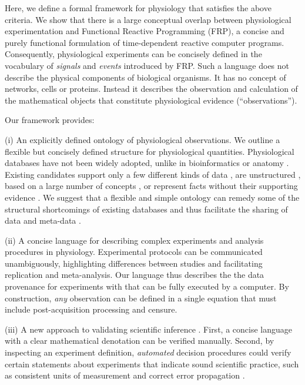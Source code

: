 \documentclass[11pt]{article}
\begin{document}
Here, we define a formal framework for physiology
that satisfies the above criteria. We show that there
is a large conceptual overlap between physiological experimentation
and Functional Reactive Programming (FRP\cite{Elliott1997,
  Nilsson2002}), a concise and purely functional formulation of
time-dependent reactive computer programs. Consequently, physiological
experiments can be concisely defined in the vocabulary of
\emph{signals} and \emph{events} introduced by FRP. Such a language
does not describe the physical components of biological organisms. It
has no concept of networks, cells or proteins. Instead it describes
the observation and calculation of the mathematical objects that
constitute physiological evidence (``observations'').

Our framework provides:

(i) An explicitly defined ontology of physiological observations. We
outline a flexible but concisely defined structure for physiological
quantities.  Physiological databases have not been widely adopted,
unlike in bioinformatics or anatomy \cite{Herz2008,
  Amari2002}. Existing candidates support only a few different kinds
of data \cite{Jessop2010}, are unstructured \cite{Teeters2008},
based on a large number of concepts \cite{Frishkoff2009}, or represent
facts without their supporting evidence \cite{Katz2010}.
We suggest that a flexible and simple ontology can remedy some of the
structural shortcomings\cite{Gardner2005, Amari2002} of existing
databases and thus facilitate the sharing of data and meta-data
\cite{Insel2003}.

(ii) A concise language for describing complex experiments and
analysis procedures in physiology. Experimental protocols can be
communicated unambiguously, highlighting differences between studies
and facilitating replication and meta-analysis. Our language thus
describes the the data provenance
\cite{Pool2002,MacKenzie-Graham2008, VanHorn2009} for experiments
with that can be fully executed by a computer. By construction,
\emph{any} observation can be defined in a single equation that must
include post-acquisition processing and censure.

(iii) A new approach to validating scientific inference
\cite{Editors2003, Editors2010}. First, a concise language with a
clear mathematical denotation can be verified manually. Second, by
inspecting an experiment definition, \emph{automated} decision procedures
could verify certain statements about experiments that indicate sound
scientific practice, such as consistent units of measurement
\cite{Kennedy1997} and correct error propagation \cite{Taylor1997}.
\end{document}

